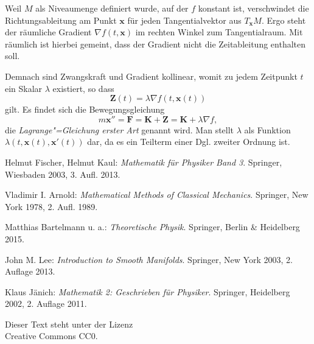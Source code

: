 \documentclass[a4paper,10pt,fleqn,twocolumn,twoside,dvipdfmx]{scrartcl}
\numberwithin{equation}{section}
\newcommand{\bv}[1]{\mathbf{#1}}
\begin{document}
Weil $M$ als Niveaumenge definiert wurde, auf der $f$ konstant ist,
verschwindet die Richtungsableitung am Punkt $\bv x$ für jeden
Tangentialvektor aus $T_{\bv x} M$. Ergo steht der räumliche Gradient
$\nabla f(t,\bv x)$ im rechten Winkel zum Tangentialraum. Mit räumlich
ist hierbei gemeint, dass der Gradient nicht die Zeitableitung enthalten
soll.

Demnach sind Zwangskraft und Gradient kollinear, womit zu jedem
Zeitpunkt $t$ ein Skalar $\lambda$ existiert, so dass
\[\bv Z(t) = \lambda\nabla f(t,\bv x(t))\]
gilt. Es findet sich die Bewegungsgleichung
\[m\bv x'' = \bv F = \bv K+\bv Z = \bv K+\lambda\nabla f,\]
die \emph{Lagrange"=Gleichung erster Art} genannt wird. Man stellt
$\lambda$ als Funktion $\lambda(t,\bv x(t),\bv x'(t))$ dar, da es
ein Teilterm einer Dgl. zweiter Ordnung ist.

\newpage
\begin{thebibliography}{00}
 Helmut Fischer, Helmut Kaul:
\emph{Mathematik für Physiker Band 3}. Springer, Wiesbaden 2003, 3. Aufl. 2013.

 Vladimir I. Arnold: \emph{Mathematical Methods of Classical
Mechanics}. Springer, New York 1978, 2. Aufl. 1989.

 Matthias Bartelmann u. a.:
\emph{Theoretische Physik}. Springer, Berlin \& Heidelberg 2015.

 John M. Lee: \emph{Introduction to Smooth Manifolds}.
Springer, New York 2003, 2. Auflage 2013.

 Klaus Jänich: \emph{Mathematik 2: Geschrieben für
Physiker}. Springer, Heidelberg 2002, 2. Auflage 2011.
\end{thebibliography}

\vfill\noindent
Dieser Text steht unter der Lizenz\\
Creative Commons CC0.
\end{document}
